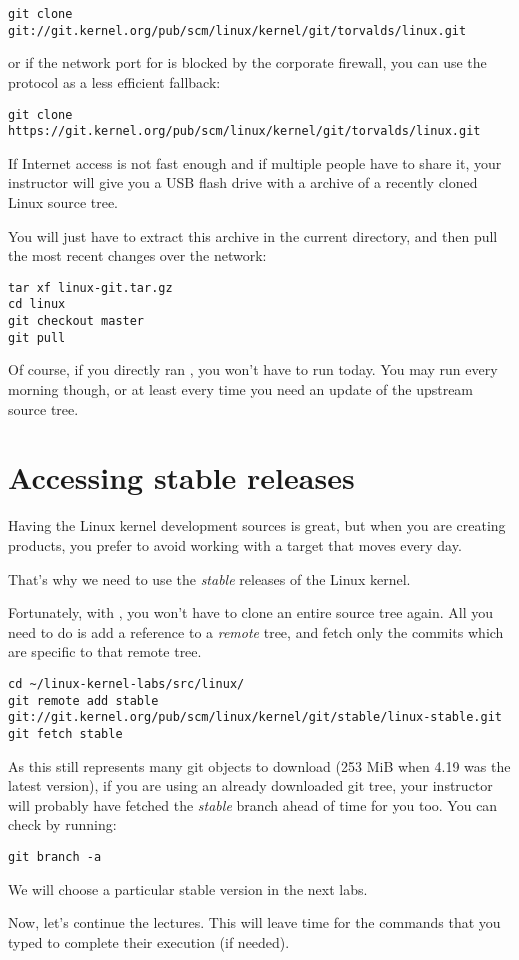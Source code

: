{\small
\begin{verbatim}
git clone git://git.kernel.org/pub/scm/linux/kernel/git/torvalds/linux.git
\end{verbatim}
}

or if the network port for  is blocked by the corporate
firewall, you can use the  protocol as a less efficient
fallback:

{\small
\begin{verbatim}
git clone https://git.kernel.org/pub/scm/linux/kernel/git/torvalds/linux.git
\end{verbatim}
}

If Internet access is not fast enough and if multiple people have to
share it, your instructor will give you a USB flash drive with a
 archive of a recently cloned Linux source tree.

You will just have to extract this archive in the current directory,
and then pull the most recent changes over the network:

\begin{verbatim}
tar xf linux-git.tar.gz
cd linux
git checkout master
git pull
\end{verbatim}

Of course, if you directly ran , you won't have to run
 today. You may run  every morning though,
or at least every time you need an update of the upstream source tree.

\section{Accessing stable releases}

Having the Linux kernel development sources is great, but when you are
creating products, you prefer to avoid working with a target that moves
every day.

That's why we need to use the {\em stable} releases of the Linux
kernel.

Fortunately, with , you won't have to clone an entire source
tree again. All you need to do is add a reference to a {\em remote}
tree, and fetch only the commits which are specific to that remote tree.

{\footnotesize
\begin{verbatim}
cd ~/linux-kernel-labs/src/linux/
git remote add stable git://git.kernel.org/pub/scm/linux/kernel/git/stable/linux-stable.git
git fetch stable
\end{verbatim}
}

As this still represents many git objects to download (253 MiB when 4.19 was
the latest version), if you are using an already downloaded git tree,
your instructor will probably have fetched the {\em stable} branch ahead
of time for you too. You can check by running:

\begin{verbatim}
git branch -a
\end{verbatim} 

We will choose a particular stable version in the next labs.

Now, let's continue the lectures. This will leave time for the commands
that you typed to complete their execution (if needed).
